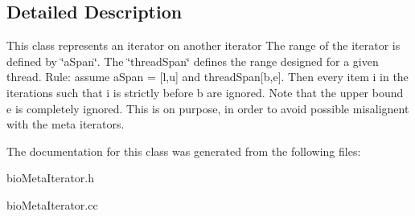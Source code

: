 \subsection{Detailed Description}
This class represents an iterator on another iterator The range of the iterator is defined by \char`\"{}a\+Span\char`\"{}. The \char`\"{}thread\+Span\char`\"{} defines the range designed for a given thread. Rule\+: assume a\+Span = \mbox{[}l,u\mbox{]} and thread\+Span\mbox{[}b,e\mbox{]}. Then every item i in the iterations such that i is strictly before b are ignored. Note that the upper bound e is completely ignored. This is on purpose, in order to avoid possible misalignent with the meta iterators. 

The documentation for this class was generated from the following files\+:\begin{DoxyCompactItemize}
\item 
bio\+Meta\+Iterator.\+h\item 
bio\+Meta\+Iterator.\+cc\end{DoxyCompactItemize}
